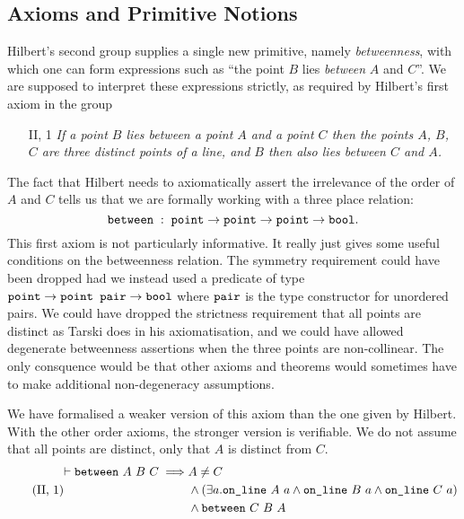 \subsection{Axioms and Primitive Notions}
Hilbert's second group supplies a single new primitive, namely \emph{betweenness}, with which one can form expressions such as ``the point $B$ lies \emph{between} $A$ and $C$''. We are supposed to interpret these expressions strictly, as required by Hilbert's first axiom in the group
\begin{enumerate}
\item[II, 1] \emph{If a point $B$ lies between a point $A$ and a point $C$ then the points $A$, $B$, $C$ are three distinct points of a line, and $B$ then also lies between $C$ and $A$.}
\end{enumerate}
The fact that Hilbert needs to axiomatically assert the irrelevance of the order of $A$ and $C$ tells us that we are formally working with a three place relation:
\begin{displaymath}
\texttt{between}\;:\;\texttt{point}\rightarrow\texttt{point}\rightarrow\texttt{point}\rightarrow\texttt{bool}.
\end{displaymath}
This first axiom is not particularly informative. It really just gives some useful conditions on the betweenness relation. The symmetry requirement could have been dropped had we instead used a predicate of type $\texttt{point}\rightarrow \texttt{point pair} \rightarrow \texttt{bool}$ where $\texttt{pair}$ is the type constructor for unordered pairs. We could have dropped the strictness requirement that all points are distinct as Tarski does in his axiomatisation, and we could have allowed degenerate betweenness assertions when the three points are non-collinear. The only consquence would be that other axioms and theorems would sometimes have to make additional non-degeneracy assumptions.

We have formalised a weaker version of this axiom than the one given by Hilbert. With the other order axioms, the stronger version is verifiable. We do not assume that all points are distinct, only that $A$ is distinct from $C$.
\begin{equation}\label{eq:g21}
 \tag{II,~1}
  \begin{split}
    \vdash\between{A}{B}{C} \implies & A \neq C\\
                               & \wedge (\exists a. \code{on\_line}\ A\ a \wedge \code{on\_line}\ B\ a \wedge \code{on\_line}\ C\ a)\\
                               & \wedge \between{C}{B}{A}
  \end{split}
\end{equation}

